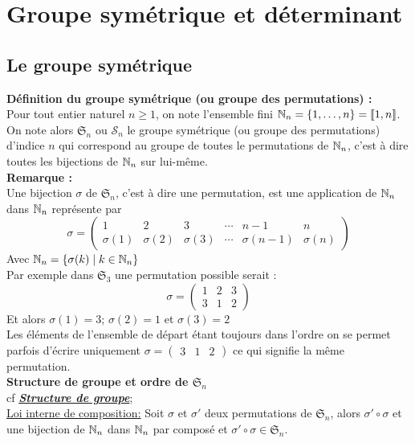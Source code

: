	\section{Groupe symétrique et déterminant}
	\subsection{Le groupe symétrique}
	\textbf{Définition du groupe symétrique (ou groupe des permutations) :}\\
	Pour tout entier naturel $n\geq 1$, on note l'ensemble fini $\mathbb{N}_n=\{1,\dots,n\}=\llbracket 1,n \rrbracket$.\\ On note alors $\mathfrak{S}_n$ ou $\mathcal{S}_n$ le groupe symétrique (ou groupe des permutations) d'indice $n$ qui correspond au groupe de toutes le permutations de $\mathbb{N}_n$, c'est à dire toutes les bijections de $\mathbb{N}_n$ sur lui-même.\\
	
	\textbf{Remarque :}\\
	Une bijection $\sigma$ de $\mathfrak{S}_n$, c'est à dire une permutation, est une application de $\mathbb{N}_n$ dans $\mathbb{N}_n$ représente par \[
	\sigma = 
	\begin{pmatrix}
		1 & 2 & 3 & \cdots & n-1 & n \\
		\sigma(1) & \sigma(2) & \sigma(3) & \cdots &  \sigma(n-1)  & \sigma(n)
	\end{pmatrix}
	\]
	Avec $\mathbb{N}_n=\{\sigma(k)\mid k\in \mathbb{N}_n\}$\\
	
	Par exemple dans $\mathfrak{S}_3$ une permutation possible serait :	
	\[
	\sigma = 
	\begin{pmatrix}
		1 & 2 & 3 \\
		3 & 1 & 2
	\end{pmatrix}
	\]
	Et alors $\sigma(1)=3$; $\sigma(2)=1$ et $\sigma(3)=2$\\
	Les éléments de l'ensemble de départ étant toujours dans l'ordre on se permet parfois d'écrire uniquement $\sigma=	\begin{pmatrix}
		3 & 1 & 2
	\end{pmatrix}$ ce qui signifie la même permutation.\\

\textbf{Structure de groupe et ordre de $\mathfrak{S}_n$}\\
cf \hyperref[structure de groupe]{\textbf{\textit{Structure de groupe}}};\\

\underline{Loi interne de composition:} Soit $\sigma$ et $\sigma'$ deux permutations de $\mathfrak{S}_n$,
alors $\sigma'\circ\sigma$ et une bijection de $\mathbb{N}_n$ dans $\mathbb{N}_n$ par composé et $\sigma'\circ\sigma\in\mathfrak{S}_n$.\\

